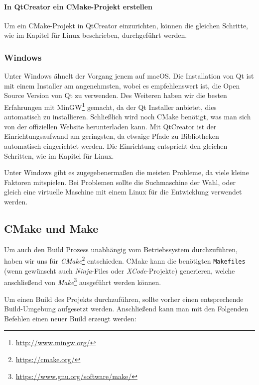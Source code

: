 \paragraph{In QtCreator ein CMake-Projekt erstellen}

Um ein CMake-Projekt in QtCreator einzurichten, können die gleichen Schritte, wie
im Kapitel für Linux beschrieben, durchgeführt werden.

\subsubsection{Windows}

Unter Windows ähnelt der Vorgang jenem auf macOS. Die Installation von Qt ist
mit einem Installer am angenehmsten, wobei es empfehlenswert ist, die Open
Source Version von Qt zu verwenden. Des Weiteren haben wir die besten
Erfahrungen mit MinGW\footnote{\url{http://www.mingw.org/}} gemacht, da der Qt
Installer anbietet, dies automatisch zu installieren. Schließlich wird noch
CMake benötigt, was man sich von der offiziellen Website herunterladen kann. Mit
QtCreator ist der Einrichtungsaufwand am geringsten, da etwaige Pfade zu
Bibliotheken automatisch eingerichtet werden. Die Einrichtung entspricht den
gleichen Schritten, wie im Kapitel für Linux.

Unter Windows gibt es zugegebenermaßen die meisten Probleme, da viele kleine
Faktoren mitspielen. Bei Problemen sollte die Suchmaschine der Wahl, oder gleich
eine virtuelle Maschine mit einem Linux für die Entwicklung verwendet werden.

\pagebreak
\subsection{CMake und Make}

Um auch den Build Prozess unabhängig vom Betriebssystem durchzuführen, haben wir
uns für \emph{CMake}\footnote{\url{https://cmake.org/}} entschieden. CMake kann
die benötigten \texttt{Makefiles} (wenn gewünscht auch \emph{Ninja}-Files oder
\emph{XCode}-Projekte) generieren, welche anschließend von
\emph{Make}\footnote{\url{https://www.gnu.org/software/make/}} ausgeführt werden
können.

Um einen Build des Projekts durchzuführen, sollte vorher einen entsprechende
Build-Umgebung aufgesetzt werden. Anschließend kann man mit den Folgenden
Befehlen einen neuer Build erzeugt werden:

